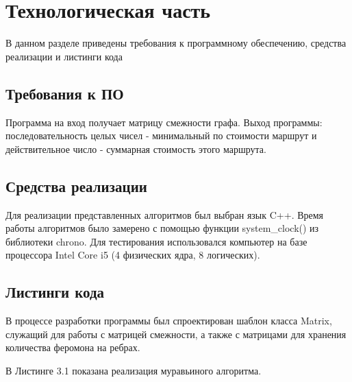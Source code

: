 \documentclass[a4paper,12pt]{report}
\begin{document}
\chapter{Технологическая часть}
\hspace{0.6cm}В данном разделе приведены требования к программному обеспечению, средства реализации и листинги кода
\section{Требования к ПО}

\hspace{0.6cm}Программа на вход получает матрицу смежности графа. Выход  программы: последовательность целых чисел - минимальный по стоимости маршрут и действительное число - суммарная стоимость этого маршрута.
	
\section{Средства реализации}
\hspace{0.6cm}Для реализации представленных алгоритмов был выбран язык C++. Время работы алгоритмов было замерено с помощью функции system\_clock() из библиотеки chrono. Для тестирования использовался компьютер на базе процессора Intel Core i5 (4 физических ядра, 8 логических).

\section{Листинги кода}

\hspace{0.6cm}В процессе разработки программы был спроектирован шаблон класса Matrix,  служащий для работы с матрицей смежности, а также с матрицами для хранения количества феромона на ребрах.

В Листинге 3.1 показана реализация муравьиного алгоритма.
\end{document}
